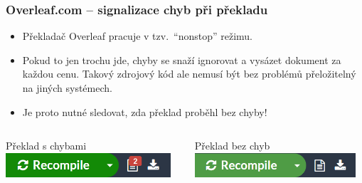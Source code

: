 \begin{frame}
	\frametitle{Overleaf.com -- signalizace chyb při překladu}
	\begin{itemize}
		\item Překladač Overleaf pracuje v tzv.\ \enquote{nonstop} režimu.
		\item Pokud to jen trochu jde, chyby se snaží ignorovat a vysázet dokument za každou cenu. Takový zdrojový kód ale nemusí být bez problémů přeložitelný na jiných systémech.
		\item \alert{Je proto nutné sledovat, zda překlad proběhl bez chyby!}
	\end{itemize}
	\begin{columns}
		\begin{column}{0.45\textwidth}
			\begin{alertblock}{Překlad s chybami}
				\centering
				\includegraphics[width=0.95\textwidth]{Lecture1/Figures/Overleaf-errors.png}
			\end{alertblock}
		\end{column}
		\begin{column}{0.45\textwidth}
			\begin{block}{Překlad bez chyb}
				\centering
				\includegraphics[width=0.95\textwidth]{Lecture1/Figures/Overleaf-no-errors.png}
			\end{block}
		\end{column}
	\end{columns}
\end{frame}


